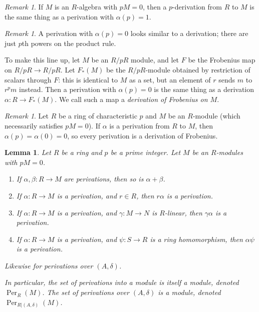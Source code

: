 \documentclass{amsart}[12pt]
\def\Per{\operatorname{Per}}
\numberwithin{equation}{section}
\theoremstyle{plain} %
\newtheorem{lem}[equation]{Lemma}
\theoremstyle{definition}
\theoremstyle{remark}
\newtheorem{rem}[equation]{Remark}
\begin{document}
 \begin{rem} If $M$ is an $R$-algebra with $pM=0$, then a $p$-derivation from $R$ to $M$ is the same thing as a perivation with $\alpha(p)=1$.
 \end{rem}
 
 \begin{rem}
A perivation with $\alpha(p)=0$ looks similar to a derivation; there are just $p$th powers on the product rule. 

To make this line up, let $M$ be an $R/pR$ module, and let $F$ be the Frobenius map on $R/pR \to R/pR$. Let $F_*(M)$ be the $R/pR$-module obtained by restriction of scalars through $F$: this is identical to $M$ as a set, but an element of $r$ sends $m$ to $r^p m$ instead. Then a perivation with $\alpha(p)=0$ is the same thing as a derivation $\alpha: R\to F_*(M)$. We call such a map a \emph{derivation of Frobenius on $M$}.
\end{rem}

\begin{rem} Let $R$ be a ring of characteristic $p$ and $M$ be an $R$-module (which necessarily satisfies $pM=0$). If $\alpha$ is a perivation from $R$ to $M$, then $\alpha(p)=\alpha(0)=0$, so every perivation is a derivation of Frobenius.
\end{rem}


\begin{lem} Let $R$ be a ring and $p$ be a prime integer. Let $M$ be an $R$-modules with $pM=0$. 
\begin{enumerate}
\item If $\alpha,\beta:R\to M$ are perivations, then so is $\alpha+\beta$.
\item  If $\alpha:R\to M$ is a perivation, and $r\in R$, then $r\alpha$ is a perivation.
\item If $\alpha:R\to M$ is a perivation, and $\gamma:M\to N$ is $R$-linear, then $\gamma \alpha$ is a perivation.
\item If $\alpha:R\to M$ is a perivation, and $\psi:S\to R$ is a ring homomorphism, then $\alpha\psi$ is a perivation.
\end{enumerate}
Likewise for perivations over $(A,\delta)$.

In particular, the set of perivations into a module is itself a module, denoted $\Per_{R}(M)$. The set of perivations over $(A,\delta)$ is a module, denoted $\Per_{R|(A,\delta)}(M)$.
\end{lem}
\end{document}
